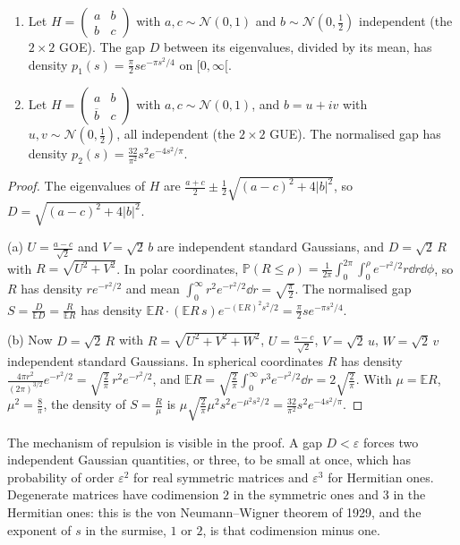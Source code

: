 \begin{proposition}\label{prop:surmise}
\begin{enumerate}[label=(\alph*)]
\item Let $H=\begin{pmatrix}a&b\\b&c\end{pmatrix}$ with $a,c\sim\mathcal N(0,1)$ and $b\sim\mathcal N(0,\frac12)$ independent (the $2\times2$ GOE). The gap $D$ between its
eigenvalues, divided by its mean, has density $p_1(s)=\frac\pi2se^{-\pi s^2/4}$ on $[0,\infty[$.
\item Let $H=\begin{pmatrix}a&b\\\overline b&c\end{pmatrix}$ with $a,c\sim\mathcal N(0,1)$, and $b=u+iv$ with $u,v\sim\mathcal N(0,\frac12)$, all independent (the $2\times2$ GUE).
The normalised gap has density $p_2(s)=\frac{32}{\pi^2}s^2e^{-4s^2/\pi}$.
\end{enumerate}
\end{proposition}
\begin{proof}
The eigenvalues of $H$ are $\frac{a+c}2\pm\frac12\sqrt{(a-c)^2+4|b|^2}$, so $D=\sqrt{(a-c)^2+4|b|^2}$.

(a) $U=\frac{a-c}{\sqrt2}$ and $V=\sqrt2\,b$ are independent standard Gaussians, and $D=\sqrt2\,R$ with $R=\sqrt{U^2+V^2}$. In polar coordinates,
$\mathbb P(R\le\rho)=\frac1{2\pi}\int_0^{2\pi}\!\!\int_0^\rho e^{-r^2/2}r\dd r\dd\phi$, so $R$ has density $re^{-r^2/2}$ and mean
$\int_0^\infty r^2e^{-r^2/2}\dd r=\sqrt{\frac\pi2}$. The normalised gap $S=\frac D{\mathbb ED}=\frac R{\mathbb ER}$ has density
$\mathbb ER\cdot(\mathbb ER\,s)e^{-(\mathbb ER)^2s^2/2}=\frac\pi2se^{-\pi s^2/4}$.

(b) Now $D=\sqrt2\,R$ with $R=\sqrt{U^2+V^2+W^2}$, $U=\frac{a-c}{\sqrt2}$, $V=\sqrt2\,u$, $W=\sqrt2\,v$ independent standard Gaussians. In spherical coordinates
$R$ has density $\frac{4\pi r^2}{(2\pi)^{3/2}}e^{-r^2/2}=\sqrt{\frac2\pi}\,r^2e^{-r^2/2}$, and $\mathbb ER=\sqrt{\frac2\pi}\int_0^\infty r^3e^{-r^2/2}\dd r=2\sqrt{\frac2\pi}$. With
$\mu=\mathbb ER$, $\mu^2=\frac8\pi$, the density of $S=\frac R\mu$ is $\mu\sqrt{\frac2\pi}\mu^2s^2e^{-\mu^2s^2/2}=\frac{32}{\pi^2}s^2e^{-4s^2/\pi}$.
\end{proof}

The mechanism of repulsion is visible in the proof. A gap $D<\varepsilon$ forces two independent Gaussian quantities, or three, to be small at once,
which has probability of order $\varepsilon^2$ for real symmetric matrices and $\varepsilon^3$ for Hermitian ones. Degenerate matrices have codimension $2$
in the symmetric ones and $3$ in the Hermitian ones: this is the von Neumann--Wigner theorem of 1929, and the exponent of $s$ in the surmise, $1$ or $2$, is
that codimension minus one.

